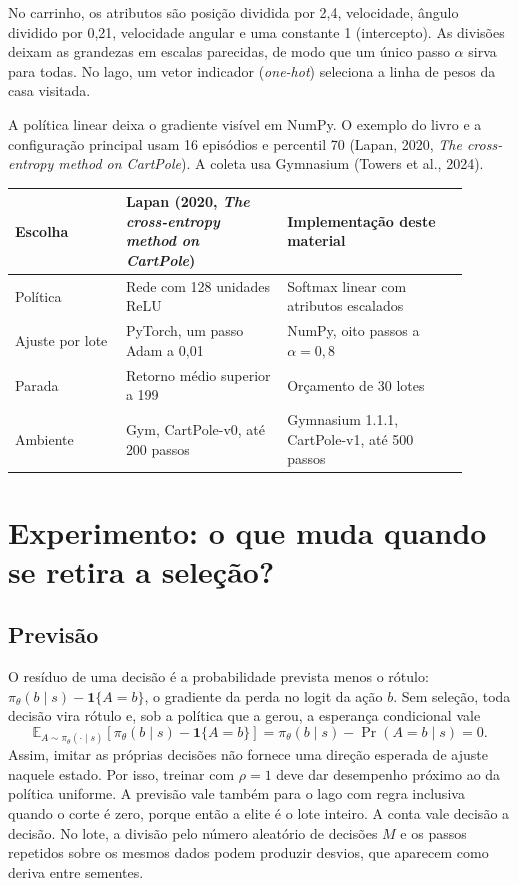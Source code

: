 \documentclass[12pt]{article}
\begin{document}
No carrinho, os atributos são posição dividida por 2,4, velocidade, ângulo dividido por 0,21, velocidade angular e uma constante 1 (intercepto). As divisões deixam as grandezas em escalas parecidas, de modo que um único passo $\alpha$ sirva para todas. No lago, um vetor indicador (\emph{one-hot}) seleciona a linha de pesos da casa visitada.

A política linear deixa o gradiente visível em NumPy. O exemplo do livro e a configuração principal usam 16 episódios e percentil 70 (Lapan, 2020, \emph{The cross-entropy method on CartPole}). A coleta usa Gymnasium (Towers et al., 2024).

\begin{center}
\small
\begin{tabular}{>{\raggedright\arraybackslash}p{0.22\linewidth}>{\raggedright\arraybackslash}p{0.32\linewidth}>{\raggedright\arraybackslash}p{0.36\linewidth}}
\toprule
Escolha & Lapan (2020, \emph{The cross-entropy method on CartPole}) & Implementação deste material\\
\midrule
Política & Rede com 128 unidades ReLU & Softmax linear com atributos escalados\\
Ajuste por lote & PyTorch, um passo Adam a 0,01 & NumPy, oito passos a $\alpha=0{,}8$\\
Parada & Retorno médio superior a 199 & Orçamento de 30 lotes\\
Ambiente & Gym, CartPole-v0, até 200 passos & Gymnasium 1.1.1, CartPole-v1, até 500 passos\\
\bottomrule
\end{tabular}
\end{center}

\section{Experimento: o que muda quando se retira a seleção?}

\subsection{Previsão}

O resíduo de uma decisão é a probabilidade prevista menos o rótulo: $\pi_\theta(b\mid s)-\mathbf 1\{A=b\}$, o gradiente da perda no logit da ação $b$. Sem seleção, toda decisão vira rótulo e, sob a política que a gerou, a esperança condicional vale
\[
\mathbb E_{A\sim\pi_\theta(\cdot\mid s)}
 [\pi_\theta(b\mid s)-\mathbf 1\{A=b\}]=\pi_\theta(b\mid s)-\Pr(A=b\mid s)=0.
\]
Assim, imitar as próprias decisões não fornece uma direção esperada de ajuste naquele estado. Por isso, treinar com $\rho=1$ deve dar desempenho próximo ao da política uniforme. A previsão vale também para o lago com regra inclusiva quando o corte é zero, porque então a elite é o lote inteiro. A conta vale decisão a decisão. No lote, a divisão pelo número aleatório de decisões $M$ e os passos repetidos sobre os mesmos dados podem produzir desvios, que aparecem como deriva entre sementes.
\end{document}
